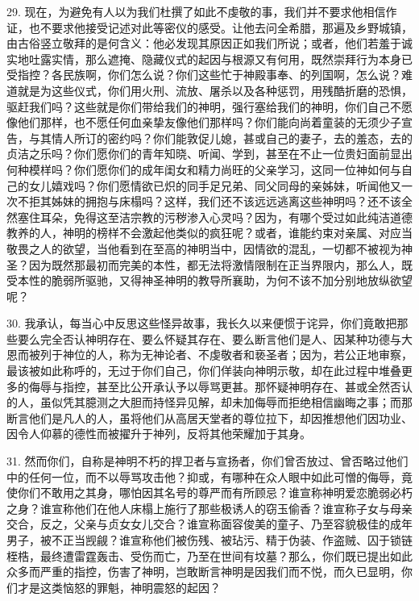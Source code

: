 29. 现在，为避免有人以为我们杜撰了如此不虔敬的事，我们并不要求他相信作证，也不要求他接受记述对此等密仪的感受。让他去问全希腊，那遍及乡野城镇，由古俗竖立敬拜的是何含义：他必发现其原因正如我们所说；或者，他们若羞于诚实地吐露实情，那么遮掩、隐藏仪式的起因与根源又有何用，既然崇拜行为本身已受指控？各民族啊，你们怎么说？你们这些忙于神殿事奉、的列国啊，怎么说？难道就是为这些仪式，你们用火刑、流放、屠杀以及各种惩罚，用残酷折磨的恐惧，驱赶我们吗？这些就是你们带给我们的神明，强行塞给我们的神明，你们自己不愿像他们那样，也不愿任何血亲挚友像他们那样吗？你们能向尚着童装的无须少子宣告，与其情人所订的密约吗？你们能敦促儿媳，甚或自己的妻子，去的羞态，去的贞洁之乐吗？你们愿你们的青年知晓、听闻、学到，甚至在不止一位贵妇面前显出何种模样吗？你们愿你们的成年闺女和精力尚旺的父亲学习，这同一位神如何与自己的女儿嬉戏吗？你们愿情欲已炽的同手足兄弟、同父同母的亲姊妹，听闻他又一次不拒其姊妹的拥抱与床榻吗？这样，我们还不该远远逃离这些神明吗？还不该全然塞住耳朵，免得这至洁宗教的污秽渗入心灵吗？因为，有哪个受过如此纯洁道德教养的人，神明的榜样不会激起他类似的疯狂呢？或者，谁能约束对亲属、对应当敬畏之人的欲望，当他看到在至高的神明当中，因情欲的混乱，一切都不被视为神圣？因为既然那最初而完美的本性，都无法将激情限制在正当界限内，那么人，既受本性的脆弱所驱驰，又得神圣神明的教导所襄助，为何不该不加分别地放纵欲望呢？\par

30. 我承认，每当心中反思这些怪异故事，我长久以来便惯于诧异，你们竟敢把那些要么完全否认神明存在、要么怀疑其存在、要么断言他们是人、因某种功德与大恩而被列于神位的人，称为无神论者、不虔敬者和亵圣者；因为，若公正地审察，最该被如此称呼的，无过于你们自己，你们佯装向神明示敬，却在此过程中堆叠更多的侮辱与指控，甚至比公开承认予以辱骂更甚。那怀疑神明存在、甚或全然否认的人，虽似凭其臆测之大胆而持怪异见解，却未加侮辱而拒绝相信幽晦之事；而那断言他们是凡人的人，虽将他们从高居天堂者的尊位拉下，却因推想他们因功业、因令人仰慕的德性而被擢升于神列，反将其他荣耀加于其身。\par

31. 然而你们，自称是神明不朽的捍卫者与宣扬者，你们曾否放过、曾否略过他们中的任何一位，而不以辱骂攻击他？抑或，有哪种在众人眼中如此可憎的侮辱，竟使你们不敢用之其身，哪怕因其名号的尊严而有所顾忌？谁宣称神明爱恋脆弱必朽之身？谁宣称他们在他人床榻上施行了那些极诱人的窃玉偷香？谁宣称子女与母亲交合，反之，父亲与贞女女儿交合？谁宣称面容俊美的童子、乃至容貌极佳的成年男子，被不正当觊觎？谁宣称他们被伤残、被玷污、精于伪装、作盗贼、囚于锁链桎梏，最终遭雷霆轰击、受伤而亡，乃至在世间有坟墓？那么，你们既已提出如此众多而严重的指控，伤害了神明，岂敢断言神明是因我们而不悦，而久已显明，你们才是这类恼怒的罪魁，神明震怒的起因？\par

